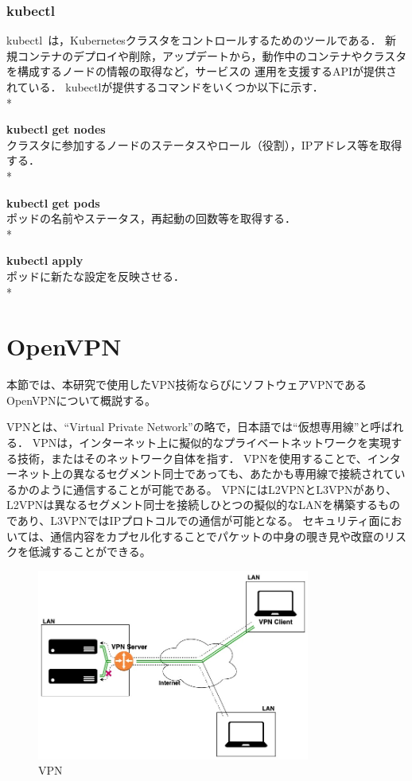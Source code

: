 \subsubsection{kubectl}
\label{background:container-orchestration-system:kubernetes:kubectl}

kubectl~\cite{kubectl}は，Kubernetesクラスタをコントロールするためのツールである．
新規コンテナのデプロイや削除，アップデートから，動作中のコンテナやクラスタを構成するノードの情報の取得など，サービスの
運用を支援するAPIが提供されている．
kubectlが提供するコマンドをいくつか以下に示す．\\*

{\bf kubectl get nodes}\\
クラスタに参加するノードのステータスやロール（役割），IPアドレス等を取得する．\\*

{\bf kubectl get pods}\\
ポッドの名前やステータス，再起動の回数等を取得する．\\*

{\bf kubectl apply}\\
ポッドに新たな設定を反映させる．\\*

\section{OpenVPN}
\label{background:openvpn}

本節では、本研究で使用したVPN技術ならびにソフトウェアVPNであるOpenVPNについて概説する。

VPNとは、``Virtual Private Network''の略で，日本語では``仮想専用線''と呼ばれる．
VPNは，インターネット上に擬似的なプライベートネットワークを実現する技術，またはそのネットワーク自体を指す．
VPNを使用することで、インターネット上の異なるセグメント同士であっても、あたかも専用線で接続されているかのように通信することが可能である。
VPNにはL2VPNとL3VPNがあり、L2VPNは異なるセグメント同士を接続しひとつの擬似的なLANを構築するものであり、L3VPNではIPプロトコルでの通信が可能となる。
セキュリティ面においては、通信内容をカプセル化することでパケットの中身の覗き見や改竄のリスクを低減することができる。

\begin{figure}[htbp]
\begin{center}
    \includegraphics[width=0.8\textwidth]{./figures/openvpn.jpg}
    \caption{VPN}
\end{center}
\end{figure}

